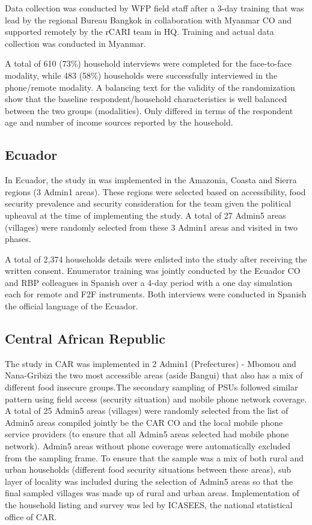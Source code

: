 \documentclass[11pt,harvard]{article}
\begin{document}
Data collection was conducted by WFP field staff after a 3-day training that was lead by the regional Bureau Bangkok in collaboration with Myanmar CO and supported remotely by the rCARI team in HQ. Training and actual data collection was conducted in Myanmar.

A total of 610 (73\%) household interviews were completed for the face-to-face modality, while 483 (58\%) households were successfully interviewed in the phone/remote modality. A balancing text for the validity of the randomization show that the baseline respondent/household characteristics is well balanced between the two groups (modalities). Only differed in terms of the respondent age and number of income sources reported by the household.

	\subsection{Ecuador}

In Ecuador, the study in was implemented in the Amazonia, Coasta and Sierra regions (3 Admin1 areas). These regions were selected based on accessibility, food security prevalence and security consideration for the team given the political upheaval at the time of implementing the study.  A total of 27 Admin5 areas (villages) were randomly selected from these 3 Admin1 areas and visited in two phases. 

A total of 2,374 households details were enlisted into the study after receiving the written consent. Enumerator training was  jointly conducted by the Ecuador CO and RBP colleagues in Spanish over a 4-day period with a one day simulation each for remote and F2F instruments. Both interviews were conducted in Spanish the official language of the Ecuador. 

	
	\subsection{Central African Republic}
	
The study in CAR was implemented in 2 Admin1 (Prefectures) - Mbomou and Nana-Gribizi the two most accessible areas (aside Bangui) that also has a mix of different food insecure groups.The secondary sampling of PSUs followed similar pattern using field access (security situation) and mobile phone network coverage. A total of 25 Admin5 areas (villages) were randomly selected from the list of Admin5 areas compiled jointly be the CAR CO and the local mobile phone service providers (to ensure that all Admin5 areas selected had mobile phone network). Admin5 areas without phone coverage were automatically excluded from the sampling frame. 
To ensure that the sample was a mix of both rural and urban households (different food security situations between these areas),  sub layer of locality was included during the selection of Admin5 areas so that the final sampled villages was made up of rural and urban areas. Implementation of the household listing and survey was led by ICASEES, the national statistical office of CAR.  
\end{document}
